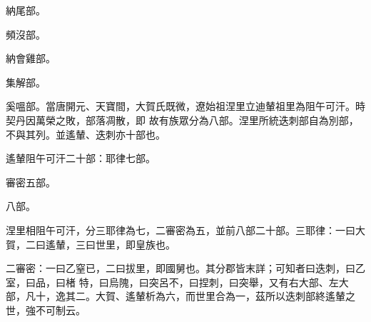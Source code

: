 \begin{pinyinscope}
 納尾部。



 頻沒部。



 納會雞部。



 集解部。



 奚嗢部。當唐開元、天寶間，大賀氏既微，遼始祖涅里立迪輦祖里為阻午可汗。時契丹因萬榮之敗，部落凋散，即
 故有族眾分為八部。涅里所統迭刺部自為別部，不與其列。並遙輦、迭刺亦十部也。



 遙輦阻午可汗二十部：耶律七部。



 審密五部。



 八部。



 涅里相阻午可汗，分三耶律為七，二審密為五，並前八部二十部。三耶律：一曰大賀，二曰遙輦，三曰世里，即皇族也。



 二審密：一曰乙窒已，二曰拔里，即國舅也。其分郡皆末詳；可知者曰迭刺，曰乙室，曰品，曰楮
 特，曰烏隗，曰突呂不，曰捏刺，曰突舉，又有右大部、左大部，凡十，逸其二。大賀、遙輦析為六，而世里合為一，茲所以迭刺部終遙輦之世，強不可制云。



\end{pinyinscope}